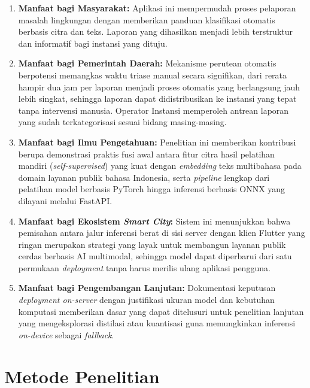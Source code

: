 \begin{enumerate}
    \item \textbf{Manfaat bagi Masyarakat:} Aplikasi ini mempermudah proses pelaporan masalah lingkungan dengan memberikan panduan klasifikasi otomatis berbasis citra dan teks. Laporan yang dihasilkan menjadi lebih terstruktur dan informatif bagi instansi yang dituju.

    \item \textbf{Manfaat bagi Pemerintah Daerah:} Mekanisme perutean otomatis berpotensi memangkas waktu triase manual secara signifikan, dari rerata hampir dua jam per laporan menjadi proses otomatis yang berlangsung jauh lebih singkat, sehingga laporan dapat didistribusikan ke instansi yang tepat tanpa intervensi manusia. Operator Instansi memperoleh antrean laporan yang sudah terkategorisasi sesuai bidang masing-masing.

    \item \textbf{Manfaat bagi Ilmu Pengetahuan:} Penelitian ini memberikan kontribusi berupa demonstrasi praktis fusi awal antara fitur citra hasil pelatihan mandiri (\textit{self-supervised}) yang kuat dengan \textit{embedding} teks multibahasa pada domain layanan publik bahasa Indonesia, serta \textit{pipeline} lengkap dari pelatihan model berbasis PyTorch hingga inferensi berbasis ONNX yang dilayani melalui FastAPI.

    \item \textbf{Manfaat bagi Ekosistem \textit{Smart City}:} Sistem ini menunjukkan bahwa pemisahan antara jalur inferensi berat di sisi server dengan klien Flutter yang ringan merupakan strategi yang layak untuk membangun layanan publik cerdas berbasis AI multimodal, sehingga model dapat diperbarui dari satu permukaan \textit{deployment} tanpa harus merilis ulang aplikasi pengguna.

    \item \textbf{Manfaat bagi Pengembangan Lanjutan:} Dokumentasi keputusan \textit{deployment on-server} dengan justifikasi ukuran model dan kebutuhan komputasi memberikan dasar yang dapat ditelusuri untuk penelitian lanjutan yang mengeksplorasi distilasi atau kuantisasi guna memungkinkan inferensi \textit{on-device} sebagai \textit{fallback}.
\end{enumerate}

\section{Metode Penelitian}

